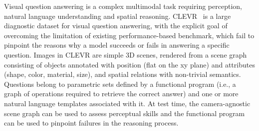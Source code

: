 Visual question answering is a complex multimodal task requiring perception, natural language understanding and spatial reasoning. CLEVR~\cite{johnson2017clevr} is a large diagnostic dataset for visual question answering, with the explicit goal of overcoming the limitation of existing performance-based benchmark, which fail to pinpoint the reasons why a model succeeds or fails in answering a specific question.
Images in CLEVR are simple 3D scenes, rendered from a scene graph consisting of objects annotated with position (flat on the xy plane) and attributes (shape, color, material, size), and spatial relations with non-trivial semantics. %
Questions belong to parametric sets defined by a functional program (i.e., a graph of operations required to retrieve the correct answer) and one or more natural language templates associated with it.
At test time, the camera-agnostic scene graph can be used to assess perceptual skills and the functional program can be used to pinpoint failures in the reasoning process.


